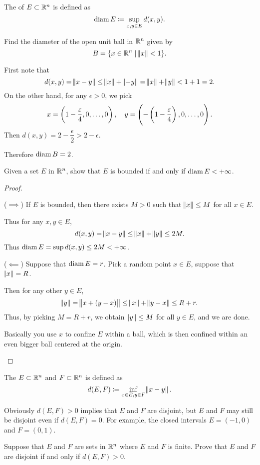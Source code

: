 \begin{definition}
The  of $E\subset\mathbb R^n$ is defined as
\[ \operatorname{diam} E\coloneqq\sup_{x,y\in E}d(x,y). \]
\end{definition}

\begin{exercise}
Find the diameter of the open unit ball in $\mathbb R^n$ given by
\[ B=\{x\in\mathbb R^n \mid \norm{x}<1\}. \]
\end{exercise}

\begin{solution}
First note that
\[ d(x,y)=\norm{x-y}\le\norm{x}+\norm{-y}=\norm{x}+\norm{y}<1+1=2. \]
On the other hand, for any $\epsilon>0$, we pick
\[ x=\left(1-\frac{\varepsilon}{4},0,\dots,0\right), \quad y=\left(-\left(1-\frac{\varepsilon}{4}\right),0,\dots,0\right). \]
Then $d(x,y)=2-\dfrac{\epsilon}{2}>2-\epsilon$.

Therefore $\operatorname{diam} B = 2$.
\end{solution}

\begin{exercise}
Given a set $E$ in $\mathbb R^n$, show that $E$ is bounded if and only if $\operatorname{diam} E<+\infty$.
\end{exercise}
\begin{proof} \

($\implies$) If $E$ is bounded, then there exists $M>0$ such that $\norm{x}\le M$ for all $x \in E$.

Thus for any $x,y \in E$,
\[ d(x,y)=\norm{x-y}\le\norm{x}+\norm{y}\le2M. \]
Thus $\operatorname{diam} E = \sup d(x,y) \le 2M<+\infty$.

($\impliedby$) Suppose that $\operatorname{diam} E=r$. Pick a random point $x \in E$, suppose that $\norm{x}=R$.

Then for any other $y \in E$,
\[ \norm{y}=\norm{x+(y-x)}\le\norm{x}+\norm{y-x}\le R+r. \]
Thus, by picking $M=R+r$, we obtain $\norm{y}\le M$ for all $y \in E$, and we are done.

\begin{remark}
Basically you use $x$ to confine $E$ within a ball, which is then confined within an even bigger ball centered at the origin.
\end{remark}
\end{proof}

\begin{definition}
The  $E\subset\mathbb R^n$ and $F\subset\mathbb R^n$ is defined as
\[ d(E,F)\coloneqq\inf_{x\in E,y\in F}\norm{x-y}. \]
\end{definition}

Obviously $d(E,F)>0$ implies that $E$ and $F$ are disjoint, but $E$ and $F$ may still be disjoint even if $d(E,F)=0$. For example, the closed intervals $E=(-1,0)$ and $F=(0,1)$.

\begin{exercise}
Suppose that $E$ and $F$ are sets in $\mathbb R^n$ where $E$ and $F$ is finite. Prove that $E$ and $F$ are disjoint if and only if $d(E,F)>0$.
\end{exercise}